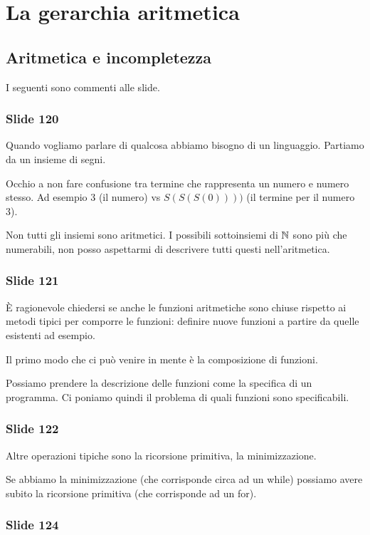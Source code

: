 \chapter{La gerarchia aritmetica}

\section{Aritmetica e incompletezza}

I seguenti sono commenti alle slide.

\subsection{Slide 120}

Quando vogliamo parlare di qualcosa abbiamo bisogno di un linguaggio. Partiamo da un insieme di
segni.

Occhio a non fare confusione tra termine che rappresenta un numero e numero stesso. Ad esempio 3
(il numero) vs $S(S(S(0))))$ (il termine per il numero 3).

Non tutti gli insiemi sono aritmetici. I possibili sottoinsiemi di $\mathbb{N}$ sono più che numerabili,
non posso aspettarmi di descrivere tutti questi nell'aritmetica.

\subsection{Slide 121}

È ragionevole chiedersi se anche le funzioni aritmetiche sono chiuse rispetto ai metodi tipici per
comporre le funzioni: definire nuove funzioni a partire da quelle esistenti ad esempio.

Il primo modo che ci può venire in mente è la composizione di funzioni.

Possiamo prendere la descrizione delle funzioni come la specifica di un programma. Ci poniamo quindi
il problema di quali funzioni sono specificabili.

\subsection{Slide 122}

Altre operazioni tipiche sono la ricorsione primitiva, la minimizzazione.

Se abbiamo la minimizzazione (che corrisponde circa ad un while) possiamo avere subito la ricorsione
primitiva (che corrisponde ad un for).

\subsection{Slide 124}

